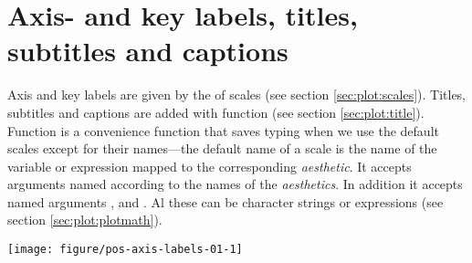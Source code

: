 \documentclass[krantz2]{krantz}\usepackage{knitr}%
\begin{document}
\section{Axis- and key labels, titles, subtitles and captions}\label{sec:plot:titles}\label{sec:plot:labs}
Axis and key labels are given by the  of scales (see section \ref{sec:plot:scales}). Titles, subtitles and captions are added with function  (see section \ref{sec:plot:title}).
Function  is a convenience function that saves typing when we use the default scales except for their names---the default name of a scale is the name of the variable or expression mapped to the corresponding \emph{aesthetic}. It accepts arguments named according to the names of the \emph{aesthetics}. In addition it accepts named arguments ,  and . Al these can be character strings or \Rlang expressions (see section \ref{sec:plot:plotmath}). 

\begin{knitrout}\footnotesize
{}\color{fgcolor}\begin{kframe}
\begin{alltt}
\hlstd{(} 
       \hlstd{(}      \hlopt{+}
  \hlstd{()} \hlopt{+}
  \hlstd{()} \hlopt{+}
  \hlstd{(} \hlstd{=} \hlstd{)} \hlopt{+}
  \hlstd{(} \hlstd{=} \hlstd{,}
        \hlstd{=} \hlstd{,}
        \hlstd{=} \hlstd{,}
        \hlstd{=} \hlstd{,}
        \hlstd{=} \hlstd{,}
        \hlstd{=} \hlstd{)}
\end{alltt}
\end{kframe}

{\centering \texttt{[image: figure/pos-axis-labels-01-1]} 

}



\end{knitrout}
\end{document}
